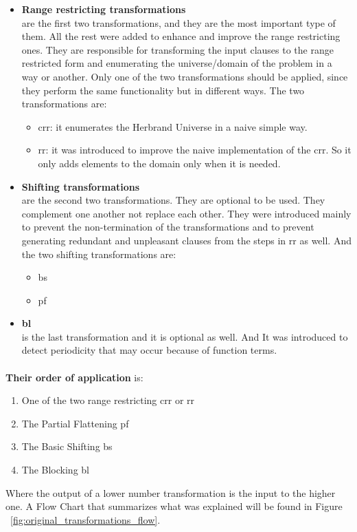 		\begin{itemize}
			\item \textbf{Range restricting transformations}
			 \hfill \\ are the first two transformations, and they are the most important type of them. All the rest were added to enhance and improve the range restricting ones. They are responsible for transforming the input clauses to the range restricted form and enumerating the universe/domain of the problem in a way or another. Only one of the two transformations should be applied, since they perform the same functionality but in different ways. The two transformations are:
			 	\begin{itemize}
			 		\item \ac{crr}: it enumerates the Herbrand Universe in a naive simple way. 
			 		\item \ac{rr}: it was introduced to improve the naive implementation of the \ac{crr}. So it only adds elements to the domain only when it is needed.
			 	\end{itemize}
			
			\item \textbf{Shifting transformations}
			 \hfill \\ are the second two transformations. They are optional to be used. They complement one another not replace each other. They were introduced mainly to prevent the non-termination of the transformations and to prevent generating redundant and unpleasant clauses from the steps in \ac{rr} as well. And the two shifting transformations are:
			 	\begin{itemize}
			 		\item \ac{bs}
			 		\item \ac{pf}
			 	\end{itemize}
			
			\item \textbf{\ac{bl}}
			 \hfill \\ is the last transformation and it is optional as well. And It was introduced to detect periodicity that may occur because of function terms. 
		\end{itemize}
		
		\paragraph{} \textbf{Their order of application} is:
			\begin{enumerate}
				\item One of the two range restricting \ac{crr} or \ac{rr}
				\item The Partial Flattening \ac{pf}
				\item The Basic Shifting \ac{bs}
				\item The Blocking \ac{bl} 
			\end{enumerate}			 
		Where the output of a lower number transformation is the input to the higher one. A Flow Chart that summarizes what was explained will be found in Figure ~\ref{fig:original_transformations_flow}.
		
